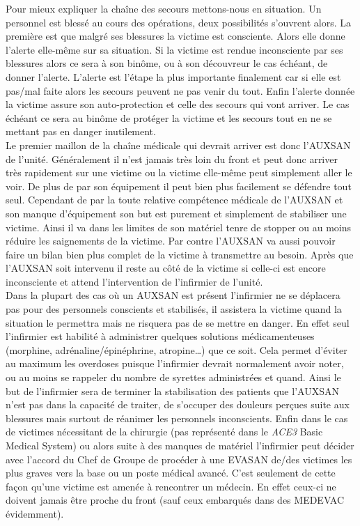 \documentclass{article}
\newcommand{\medsys}{\emph{ACE3} Basic Medical System}
\begin{document}
		Pour mieux expliquer la chaîne des secours mettons-nous en situation. Un personnel est blessé au cours des opérations, deux possibilités s'ouvrent alors. La première est que malgré ses blessures la victime est consciente. Alors elle donne l'alerte elle-même sur sa situation. Si la victime est rendue inconsciente par ses blessures alors ce sera à son binôme, ou à son découvreur le cas échéant, de donner l'alerte. L'alerte est l'étape la plus importante finalement car si elle est pas/mal faite alors les secours peuvent ne pas venir du tout. Enfin l'alerte donnée la victime assure son auto-protection et celle des secours qui vont arriver. Le cas échéant ce sera au binôme de protéger la victime et les secours tout en ne se mettant pas en danger inutilement.\\
		
		Le premier maillon de la chaîne médicale qui devrait arriver est donc l'AUXSAN de l'unité. Généralement il n'est jamais très loin du front et peut donc arriver très rapidement sur une victime ou la victime elle-même peut simplement aller le voir. De plus de par son équipement il peut bien plus facilement se défendre tout seul. Cependant de par la toute relative compétence médicale de l'AUXSAN et son manque d'équipement son but est purement et simplement de stabiliser une victime. Ainsi il va dans les limites de son matériel tenre de stopper ou au moins réduire les saignements de la victime. Par contre l'AUXSAN va aussi pouvoir faire un bilan bien plus complet de la victime à transmettre au besoin. Après que l'AUXSAN soit intervenu il reste au côté de la victime si celle-ci est encore inconsciente et attend l'intervention de l'infirmier de l'unité. \\
		
		Dans la plupart des cas où un AUXSAN est présent l'infirmier ne se déplacera pas pour des personnels conscients et stabilisés, il assistera la victime quand la situation le permettra mais ne risquera pas de se mettre en danger. En effet seul l'infirmier est habilité à administrer quelques solutions médicamenteuses (morphine, adrénaline/épinéphrine, atropine\dots) que ce soit. Cela permet d'éviter au maximum les overdoses puisque l'infirmier devrait normalement avoir noter, ou au moins se rappeler du nombre de syrettes administrées et quand. Ainsi le but de l'infirmier sera de terminer la stabilisation des patients que l'AUXSAN n'est pas dans la capacité de traiter, de s'occuper des douleurs perçues suite aux blessures mais surtout de réanimer les personnels inconscients. Enfin dans le cas de victimes nécessitant de la chirurgie (pas représenté dans le \medsys) ou alors suite à des manques de matériel l'infirmier peut décider avec l'accord du Chef de Groupe de procéder à une EVASAN de/des victimes les plus graves vers la base ou un poste médical avancé. C'est seulement de cette façon qu'une victime est amenée à rencontrer un médecin. En effet ceux-ci ne doivent jamais être proche du front (sauf ceux embarqués dans des MEDEVAC évidemment).\\
		
\end{document}
